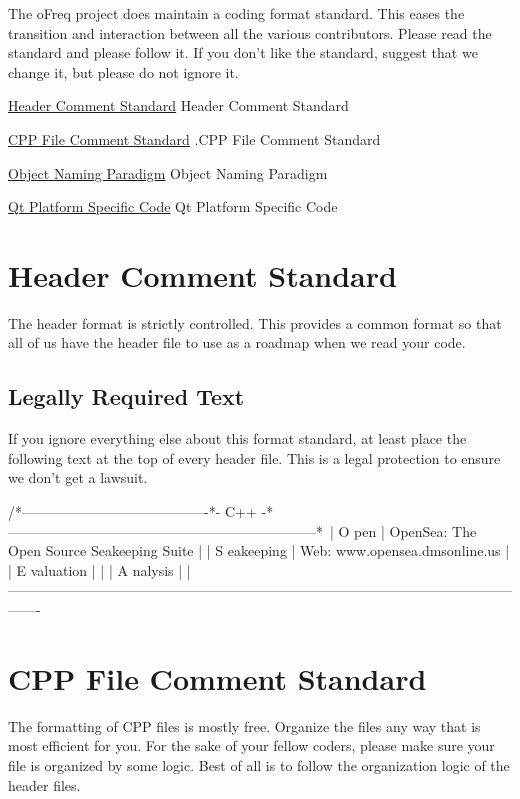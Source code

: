 The o\-Freq project does maintain a coding format standard. This eases the transition and interaction between all the various contributors. Please read the standard and please follow it. If you don't like the standard, suggest that we change it, but please do not ignore it.

\hyperlink{header_comment}{Header Comment Standard} Header Comment Standard

\hyperlink{cpp_comments}{C\-P\-P File Comment Standard} .C\-P\-P File Comment Standard

\hyperlink{object_paradigm}{Object Naming Paradigm} Object Naming Paradigm

\hyperlink{qt_platform_code}{Qt Platform Specific Code} Qt Platform Specific Code \hypertarget{header_comment}{}\section{Header Comment Standard}\label{header_comment}
The header format is strictly controlled. This provides a common format so that all of us have the header file to use as a roadmap when we read your code.\hypertarget{header_comment_requiredtext}{}\subsection{Legally Required Text}\label{header_comment_requiredtext}
If you ignore everything else about this format standard, at least place the following text at the top of every header file. This is a legal protection to ensure we don't get a lawsuit. \begin{DoxyVerb}/*----------------------------------------*- C++ -*------------------------------------------------------------------*\
| O pen         | OpenSea: The Open Source Seakeeping Suite                                                           |
| S eakeeping   | Web:     www.opensea.dmsonline.us                                                                   |
| E valuation   |                                                                                                     |
| A nalysis     |                                                                                                     |
\*------------------------------------------------------------------------------------------------------------------- \end{DoxyVerb}
 \hypertarget{cpp_comments}{}\section{C\-P\-P File Comment Standard}\label{cpp_comments}
The formatting of C\-P\-P files is mostly free. Organize the files any way that is most efficient for you. For the sake of your fellow coders, please make sure your file is organized by some logic. Best of all is to follow the organization logic of the header files.

